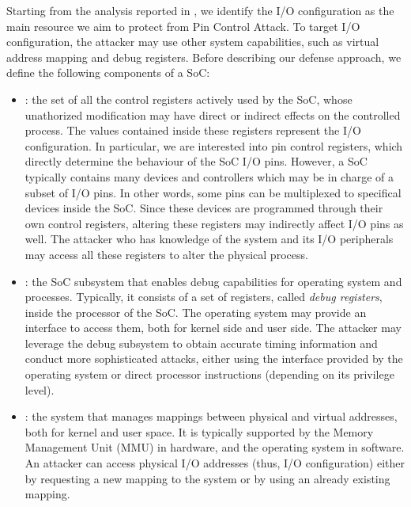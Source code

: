 Starting from the analysis reported in , we identify the I/O configuration as the main resource we aim to protect from Pin Control Attack.
To target I/O configuration, the attacker may use other system capabilities, such as virtual address mapping and debug registers.
Before describing our defense approach, we define the following components of a SoC:
\begin{itemize}
	\item {}: the set of all the control registers actively used by the SoC, whose unathorized modification may have direct or indirect
		effects on the controlled process. The values contained inside these registers represent the I/O configuration.
		In particular, we are interested into pin control registers, which directly determine the behaviour of the SoC I/O pins.
		However, a SoC typically contains many devices and controllers which may be in charge of a subset of I/O pins. In other words, some pins
		can be multiplexed to specifical devices inside the SoC. Since these devices are programmed through their own control registers,
		altering these registers may indirectly affect I/O pins as well.
		The attacker who has knowledge of the system and its I/O peripherals may access all these registers to alter the physical process.
	\item {}: the SoC subsystem that enables debug capabilities for operating system and processes.
		Typically, it consists of a set of registers, called \emph{debug registers}, inside the processor of the SoC.
		The operating system may provide an interface to access them, both for kernel side and user side.
		The attacker may leverage the debug subsystem to obtain accurate timing information and conduct more sophisticated attacks,
		either using the interface provided by the operating system or direct processor instructions (depending on its privilege level).
	\item {}: the system that manages mappings between physical and virtual addresses, both for kernel and user space.
		It is typically supported by the Memory Management Unit (MMU) in hardware, and the operating system in software.
		An attacker can access physical I/O addresses (thus, I/O configuration) either by requesting a new mapping to the system or by using an already existing mapping.
\end{itemize}

